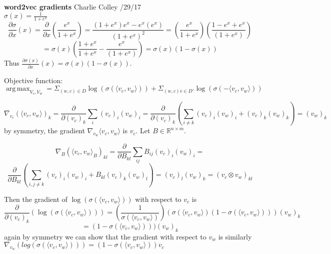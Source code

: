 \documentclass{report}
\DeclareMathOperator*{\argmax}{arg\,max}
\begin{document}
   \textbf{word2vec gradients} \quad Charlie Colley /29/17\\
   
   
   
   $ \sigma(x) = \frac{1}{1 + e^{x}} $
   \[\frac{\partial \sigma}{\partial x}(x) 
     =  \frac{\partial}{\partial x}(\frac{e^x}{1+e^x}) 
     =  \frac{(1 + e^x)e^x - e^x(e^x)}{(1 + e^x)^2} 
     = (\frac{e^x}{1+ e^x})(\frac{1 - e^x + e^x}{(1 + e^x)}) \]
     \[
     = \sigma(x)(\frac{1+e^x}{1+e^x} -\frac{e^x}{(1+e^x)})
     = \sigma(x)(1 - \sigma(x))
   \]
   Thus  $\frac{\partial \sigma(x)}{\partial x}(x) =
           \sigma(x)(1 - \sigma(x))$.
           
\vspace{10 mm}
   Objective function:\\
   $ \displaystyle\argmax_{V_c, V_w} 
     = \displaystyle\Sigma_{(w,c) \in D} 
     \log(\sigma(\langle v_c, v_w\rangle))  +\displaystyle\Sigma_{(w,c)v\in D'} 
         \log(\sigma(-\langle v_c, v_w \rangle)) $

   \[
      \nabla_{v_c} (\langle v_c, v_w \rangle)_k = \frac{\partial}{\partial (v_c)_k}\displaystyle \sum_{i}(v_c)_i(v_w)_i = \frac{\partial}{\partial (v_c)_k}(\displaystyle \sum_{i \neq k}(v_c)_i(v_w)_i + (v_c)_k(v_w)_k) = (v_w)_k
   \]
   by symmetry, the gradient $\nabla_{v_w} \langle v_c, v_w \rangle $ is $ v_c $.
   Let $ B \in \mathbb{R}^{n \times m}$.
     
    \[ \nabla_{B} (\langle v_c, v_w \rangle_{B})_{kl} = \frac{\partial}{\partial B_{kl}}\displaystyle \sum_{ij}B_{ij}(v_c)_i(v_w)_i = \]
    \[\frac{\partial}{\partial B_{kl}}(\displaystyle \sum_{i,j \neq k}(v_c)_i(v_w)_i + B_{kl}(v_c)_k(v_w)_l) = (v_c)_l(v_w)_k = (v_c \otimes v_w)_{kl}\]
    
    Then the gradient of $ \log(\sigma(\langle v_c, v_w \rangle )) $ with respect to $ v_c $ is 
    \[
      \frac{\partial}{\partial (v_c)_k}(\log(\sigma(\langle v_c, v_w \rangle)))
      = (\frac{1}{\sigma(\langle v_c, v_w \rangle)})(\sigma(\langle v_c, v_w \rangle)(1 - \sigma(\langle v_c, v_w \rangle)))(v_w)_k 
    \]
    \[
      = (1 - \sigma(\langle v_c, v_w \rangle)))(v_w)_k 
    \]
    again by symmetry we can show that the gradient with respect to $ v_w $ is similarly $ \nabla_{v_w}(log(\sigma(\langle v_c, v_w \rangle))) = (1 - \sigma(\langle v_c, v_w \rangle))v_c $
    
    
\end{document}
